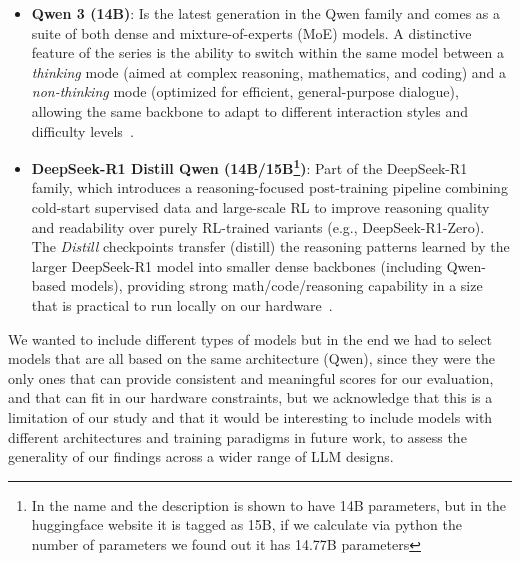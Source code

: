 \begin{itemize}

\item \textbf{Qwen 3 (14B)}: Is the latest generation in the Qwen family and comes as a suite of both dense and mixture-of-experts (MoE) models. A distinctive feature of the series is the ability to switch within the same model between a \emph{thinking} mode (aimed at complex reasoning, mathematics, and coding) and a \emph{non-thinking} mode (optimized for efficient, general-purpose dialogue), allowing the same backbone to adapt to different interaction styles and difficulty levels~\cite{site:huggingfaceQwenQwen314BHugging}.
\item \textbf{DeepSeek-R1 Distill Qwen (14B/15B\footnote{In the name and the description is shown to have 14B parameters, but in the huggingface website it is tagged as 15B, if we calculate via python the number of parameters we found out it has 14.77B parameters})}: Part of the DeepSeek-R1 family, which introduces a reasoning-focused post-training pipeline combining cold-start supervised data and large-scale \ac{RL} to improve reasoning quality and readability over purely \ac{RL}-trained variants (e.g., DeepSeek-R1-Zero). The \emph{Distill} checkpoints transfer (distill) the reasoning patterns learned by the larger DeepSeek-R1 model into smaller dense backbones (including Qwen-based models), providing strong math/code/reasoning capability in a size that is practical to run locally on our hardware~\cite{Paper:deepseekai2025deepseekr1incentivizingreasoningcapability,site:mediumWhatDeepSeekR1}.

\end{itemize}

We wanted to include different types of models but in the end we had to select models that are all based on the same architecture (Qwen), since they were the only ones that can provide consistent and meaningful scores 
for our evaluation, and that can fit in our hardware constraints, but we acknowledge that this is a limitation of our study and that it would be interesting to include models with different architectures and training paradigms 
in future work, to assess the generality of our findings across a wider range of \ac{LLM} designs.

